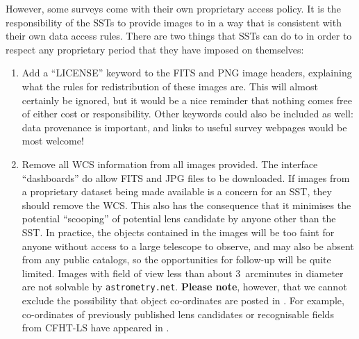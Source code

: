 \documentclass[a4paper]{article}
\begin{document}
However, some surveys come with their own proprietary access policy. It is the responsibility
of the SSTs to provide images to \sw in a way that is consistent
with their own data access rules. There are two things that SSTs can
do to in order to respect any proprietary period that they have imposed on
themselves:
\begin{enumerate}

\item Add a ``LICENSE'' keyword to the FITS and PNG image headers, explaining
what the rules for redistribution of these images are. This will almost
certainly be ignored, but it would be a nice reminder that nothing comes free
of either cost or responsibility. Other keywords could also be included as
well: data provenance is important, and links to useful survey webpages would
be most welcome!

\item Remove all WCS information from all images provided. The \sw interface ``dashboards'' do allow FITS and JPG files to be downloaded. If images from a proprietary dataset being made available is a concern for an SST, they should remove the WCS. This also has the consequence that it minimises the potential ``scooping'' of potential lens candidate by anyone other than the SST. 
In practice, the objects contained in the \sw images will be too faint
for anyone without access to a large telescope to observe, and may also be
absent from any public catalogs, so the opportunities for follow-up will be
quite limited. Images
with field of view less than about 3~arcminutes in diameter are not solvable
by \texttt{astrometry.net}. \textbf{Please note}, however, that we cannot exclude the possibility that object co-ordinates are posted in \Talk. For example, co-ordinates of previously published lens candidates or recognisable fields from CFHT-LS have appeared in \Talk.



\end{enumerate}
\end{document}
